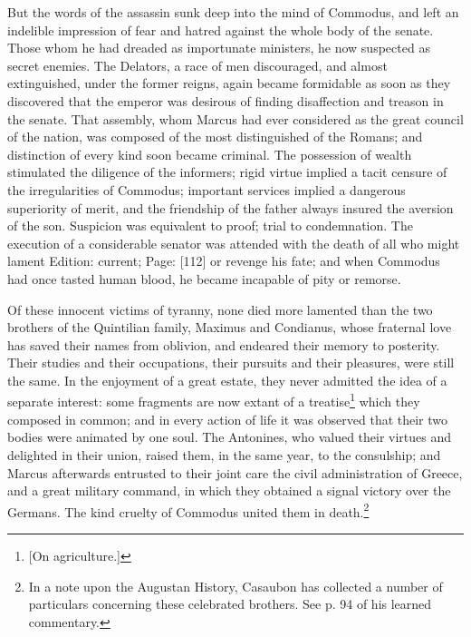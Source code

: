 But the words of the assassin sunk deep into the mind of Commodus, and left an indelible impression of fear and hatred against the whole body of the senate. Those whom he had dreaded as importunate ministers, he now suspected as secret enemies. The Delators, a race of men discouraged, and almost extinguished, under the former reigns, again became formidable as soon as they discovered that the emperor was desirous of finding disaffection and treason in the senate. That assembly, whom Marcus had ever considered as the great council of the nation, was composed of the most distinguished of the Romans; and distinction of every kind soon became criminal. The possession of wealth stimulated the diligence of the informers; rigid virtue implied a tacit censure of the irregularities of Commodus; important services implied a dangerous superiority of merit, and the friendship of the father always insured the aversion of the son. Suspicion was equivalent to proof; trial to condemnation. The execution of a considerable senator was attended with the death of all who might lament Edition: current; Page: [112] or revenge his fate; and when Commodus had once tasted human blood, he became incapable of pity or remorse.

Of these innocent victims of tyranny, none died more lamented than the two brothers of the Quintilian family, Maximus and Condianus, whose fraternal love has saved their names from oblivion, and endeared their memory to posterity. Their studies and their occupations, their pursuits and their pleasures, were still the same. In the enjoyment of a great estate, they never admitted the idea of a separate interest: some fragments are now extant of a treatise\footnote{[On agriculture.]} which they composed in common; and in every action of life it was observed that their two bodies were animated by one soul. The Antonines, who valued their virtues and delighted in their union, raised them, in the same year, to the consulship; and Marcus afterwards entrusted to their joint care the civil administration of Greece, and a great military command, in which they obtained a signal victory over the Germans. The kind cruelty of Commodus united them in death.\footnote{In a note upon the Augustan History, Casaubon has collected a number of particulars concerning these celebrated brothers. See p. 94 of his learned commentary.}

